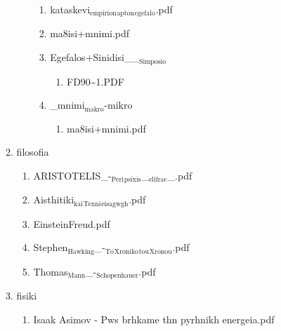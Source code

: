 \documentclass[11pt]{article}
\begin{document}
\begin{enumerate}
\begin{enumerate}
\begin{enumerate}
\begin{enumerate}
\item kataskevi$_{\text{empirion}}$$_{\text{apton}}$$_{\text{egefalo}}$.pdf
\label{sec-1-1-1-1-49-2-2-1-65-6-2}

\item ma8isi+mnimi.pdf
\label{sec-1-1-1-1-49-2-2-1-65-6-3}

\item Egefalos+Sinidisi\_\_$_{\text{Simposio}}$
\label{sec-1-1-1-1-49-2-2-1-65-6-4}
\begin{enumerate}
\item FD90\textasciitilde{}1.PDF
\label{sec-1-1-1-1-49-2-2-1-65-6-4-1}
\end{enumerate}

\item \_mnimi$_{\text{makro}}$-mikro
\label{sec-1-1-1-1-49-2-2-1-65-6-5}
\begin{enumerate}
\item ma8isi+mnimi.pdf
\label{sec-1-1-1-1-49-2-2-1-65-6-5-1}
\end{enumerate}
\end{enumerate}
\end{enumerate}

\item filosofia
\label{sec-1-1-1-1-49-2-2-1-66}
\begin{enumerate}
\item ARISTOTELIS\_-$_{\text{Peri}}$$_{\text{psixis}}$\_$_{\text{elifrac}}$\_.pdf
\label{sec-1-1-1-1-49-2-2-1-66-1}

\item Aisthitiki$_{\text{kai}}$$_{\text{Texni}}$$_{\text{eisagwgh}}$.pdf
\label{sec-1-1-1-1-49-2-2-1-66-2}

\item EinsteinFreud.pdf
\label{sec-1-1-1-1-49-2-2-1-66-3}

\item Stephen$_{\text{Hawking}}$\_-$_{\text{To}}$$_{\text{Xroniko}}$$_{\text{tou}}$$_{\text{Xronou}}$.pdf
\label{sec-1-1-1-1-49-2-2-1-66-4}

\item Thomas$_{\text{Mann}}$\_-$_{\text{Schopenhauer}}$.pdf
\label{sec-1-1-1-1-49-2-2-1-66-5}
\end{enumerate}

\item fisiki
\label{sec-1-1-1-1-49-2-2-1-67}
\begin{enumerate}
\item Isaak Asimov - Pws brhkame thn pyrhnikh energeia.pdf
\label{sec-1-1-1-1-49-2-2-1-67-1}


\end{enumerate}
\end{enumerate}
\end{enumerate}
\end{document}
